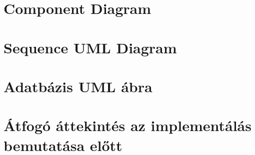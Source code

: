 

\section{Component Diagram}
\section{Sequence UML Diagram}
\section{Adatbázis UML ábra}

\section{Átfogó áttekintés az implementálás bemutatása előtt}